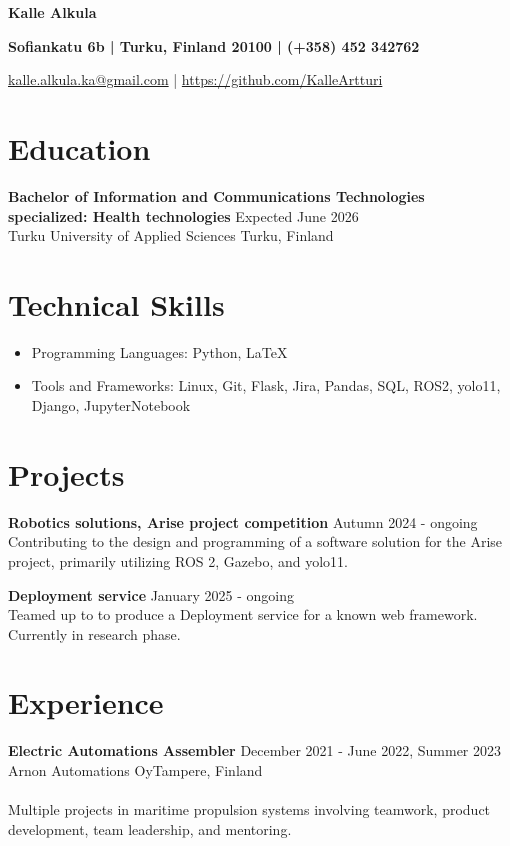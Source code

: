 \documentclass[15pt, letterpaper]{article}
\begin{document}
\begin{center}
	
\textbf{Kalle Alkula}

\textbf{Sofiankatu 6b | Turku, Finland 20100 | (+358) 452 342762}\

\href{mailto:kalle.alkula.ka@gmail.com}{kalle.alkula.ka@gmail.com} | \href{https://github.com/KalleArtturi}{https://github.com/KalleArtturi}
\end{center}

\section*{Education}
\textbf{Bachelor of Information and Communications Technologies\\ specialized: Health technologies} \hfill Expected June 2026\\
 Turku University of Applied Sciences  \hfill Turku, Finland\\


\section*{Technical Skills}
\begin{itemize}[leftmargin=*,noitemsep,topsep=-17pt]
	\item Programming Languages: Python, LaTeX
	\item Tools and Frameworks: Linux, Git, Flask, Jira, Pandas, SQL, ROS2, yolo11, Django, JupyterNotebook
\end{itemize}

\section*{Projects}

\textbf{Robotics solutions, Arise project competition} \hfill Autumn 2024 - ongoing\\
Contributing to the design and programming of a software solution for the Arise project, primarily utilizing ROS 2, Gazebo, and yolo11.

\textbf{Deployment service  } \hfill January 2025 - ongoing\\
Teamed up to to produce a Deployment service for a known web framework. Currently in research phase.\\

\section*{Experience}
\textbf{Electric Automations Assembler} \hfill December 2021 - June 2022, Summer 2023 \\
Arnon Automations Oy\hfill Tampere, Finland\\\\
Multiple projects in maritime propulsion systems involving teamwork, product development, team leadership, and mentoring.\\
\end{document}
